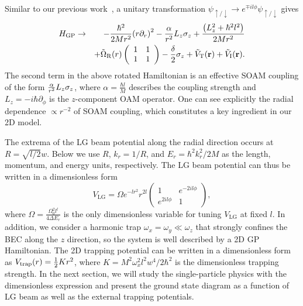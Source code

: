 \documentclass[twocolumn,pra,unsortedaddress,showpacs,floatfix,citeautoscript,nofootinbib]{revtex4-1}
\begin{document}
Similar to our previous work~\cite{Sun2014}, a unitary
transformation $\psi _{\uparrow /\downarrow }\rightarrow e^{\mp
il\phi }\psi _{\uparrow /\downarrow }$ gives
\begin{eqnarray}
{H_{{\rm{GP}}}} &\to&  - \frac{{{\hbar ^2}}}{{2M{r^2}}}{\left(
{r{\partial _r}} \right)^2} - \frac{\alpha }{{{r^2}}}{L_z}{\sigma
_z} + \frac{{\left( {L_z^2 + {\hbar ^2}{l^2}}
\right)}}{{2M{r^2}}}\nonumber\\
&&+ {{\tilde \Omega }_{\rm{R}}}(r)\left( {\begin{array}{*{20}{c}}
1&1\\
1&1
\end{array}} \right) - \frac{\delta }{2}{\sigma _z} + {{\tilde V}_{\rm{T}}}({\bf{r}}) + {{\tilde V}_{\rm{I}}}({\bf{r}}).
\end{eqnarray}
The second term in the above rotated Hamiltonian is an effective SOAM coupling of the form $\frac{\alpha }{%
r^{2}}L_{z}\sigma _{z}$, where $\alpha =\frac{\hbar l}{M}$
describes the coupling strength and $L_{z}=-i\hbar \partial _{\phi
}$ is the $z$-component OAM operator. One can see explicitly the
radial dependence $\propto r^{-2}$ of SOAM coupling, which
constitutes a key ingredient in our 2D model.

The extrema of the LG beam potential along the radial direction occurs at $R=%
\sqrt{l/2}w$. Below we use $R$, $k_{r}=1/R$, and $E_{r}={\hbar
^{2}k_{r}^{2}}/{2M}$ as the length, momentum, and energy units,
respectively. The LG beam potential can thus be written in a
dimensionless form
\begin{equation}
V_{\text{LG}}=\Omega e^{-lr^{2}}r^{2l}\left(
\begin{array}{cc}
1 & e^{-2il\phi } \\
e^{2il\phi } & 1
\end{array}
\right) ,
\end{equation}
where $\Omega =\frac{\Omega _{0}^{2}l^{l}}{4\Delta E_{r}}$ is the
only dimensionless variable for tuning $V_{\text{LG}}$ at fixed
$l$. In addition, we consider a harmonic trap $\omega _{x}=\omega
_{y}\ll \omega _{z}$ that strongly confines the BEC along the $z$
direction, so the system is well described by a 2D GP Hamiltonian.
The 2D trapping potential can be written in a dimensionless form
as $V_{\rm{trap}}(r)=\frac{1}{2}Kr^{2}$, where $K=M^{2}\omega
_{x}^{2}l^{2}w^{4}/2\hbar ^{2}$ is the dimensionless trapping
strength. In the next section, we will study the single-particle
physics with the dimensionless expression and present the ground
state diagram as a function of LG beam as well as the external
trapping potentials.
\end{document}
